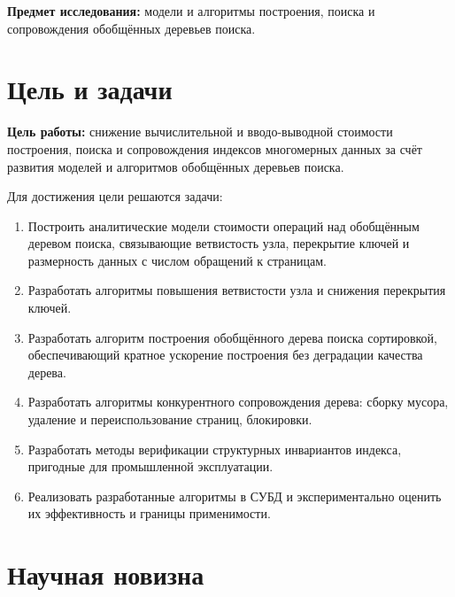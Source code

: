 \textbf{Предмет исследования:} модели и алгоритмы построения, поиска и
сопровождения обобщённых деревьев поиска.

\section*{Цель и задачи}

\textbf{Цель работы:} снижение вычислительной и вводо-выводной стоимости
построения, поиска и сопровождения индексов многомерных данных за счёт развития
моделей и алгоритмов обобщённых деревьев поиска.

Для достижения цели решаются задачи:

\begin{enumerate}
\item Построить аналитические модели стоимости операций над обобщённым деревом
      поиска, связывающие ветвистость узла, перекрытие ключей и размерность
      данных с числом обращений к страницам.
\item Разработать алгоритмы повышения ветвистости узла и снижения перекрытия
      ключей.
\item Разработать алгоритм построения обобщённого дерева поиска сортировкой,
      обеспечивающий кратное ускорение построения без деградации качества
      дерева.
\item Разработать алгоритмы конкурентного сопровождения дерева: сборку мусора,
      удаление и переиспользование страниц, блокировки.
\item Разработать методы верификации структурных инвариантов индекса, пригодные
      для промышленной эксплуатации.
\item Реализовать разработанные алгоритмы в СУБД \pg{} и экспериментально
      оценить их эффективность и границы применимости.
\end{enumerate}

\section*{Научная новизна}

